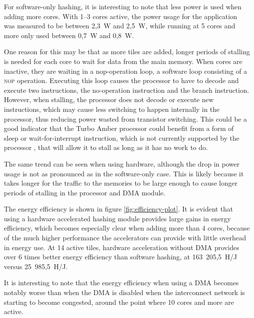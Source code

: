 For software-only hashing, it is interesting to note that less power is used when adding more cores. With 1--3 cores
active, the power usage for the application was measured to be between 2,3~W and 2,5~W, while running at 5 cores and
more only used between 0,7~W and 0,8~W.

One reason for this may be that as more tiles are added, longer periods of stalling is needed for each core to wait for data from
the main memory. When cores are inactive, they are waiting in a nop-operation loop, a software loop consisting of a
\textsc{nop} operation. Executing this loop causes the processor to have to decode and execute two instructions,
the no-operation instruction and the branch instruction. However, when stalling, the processor does not decode or
execute new instructions, which may cause less switching to happen internally in the processor, thus reducing power
wasted from transistor switching. This could be a good indicator that the Turbo Amber processor could benefit
from a form of sleep or wait-for-interrupt instruction, which is not currently supported by the processor \cite{amber-spec}, that will
allow it to stall as long as it has no work to do.

The same trend can be seen when using hardware, although the drop in power usage is not as pronounced as in the software-only
case. This is likely because it takes longer for the traffic to the memories to be large enough to cause longer periods of
stalling in the processor and DMA module.

The energy efficiency is shown in figure \ref{fig:efficiency-plot}. It is evident that using a hardware accelerated
hashing module provides large gains in energy efficiency, which becomes especially clear when adding more than 4 cores,
because of the much higher performance the accelerators can provide with little overhead in energy use. At 14 active
tiles, hardware acceleration without DMA provides over 6 times better energy efficiency than software hashing,
at 163~205,5~H/J versus 25~985,5~H/J.

It is interesting to note that the energy efficiency when using a DMA becomes notably worse than when the DMA is disabled
when the interconnect network is starting to become congested, around the point where 10 cores and more are active.

